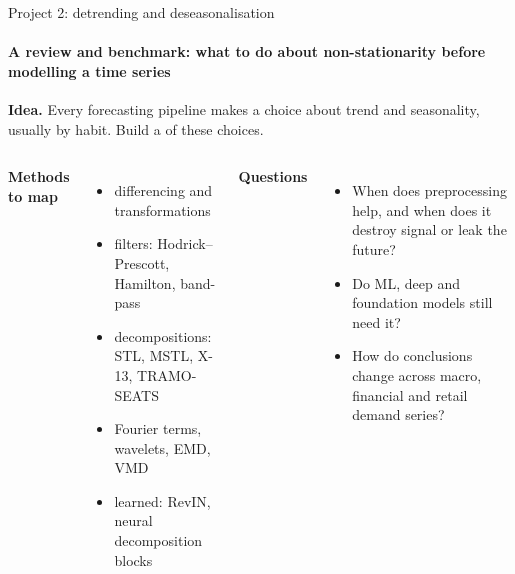 \documentclass[aspectratio=169,11pt,t]{beamer}
\begin{document}
\begin{frame}{Project 2: detrending and deseasonalisation}
  \framesubtitle{A review and benchmark: what to do about non-stationarity before modelling a time series}
  \textbf{Idea.} Every forecasting pipeline makes a choice about trend and seasonality, usually by
  habit. Build a  of these choices.

  \medskip
  \begin{columns}[T,onlytextwidth]
    \textbf{Methods to map}
    \begin{itemize}\small
      \item differencing and transformations
      \item filters: Hodrick--Prescott, Hamilton, band-pass
      \item decompositions: STL, MSTL, X-13, TRAMO-SEATS
      \item Fourier terms, wavelets, EMD, VMD
      \item learned: RevIN, neural decomposition blocks
    \end{itemize}
    \textbf{Questions}
    \begin{itemize}\small
      \item When does preprocessing help, and when does it destroy signal or leak the future?
      \item Do ML, deep and foundation models still need it?
      \item How do conclusions change across macro, financial and retail demand series?
    \end{itemize}
  \end{columns}

  \medskip
\end{frame}
\end{document}
